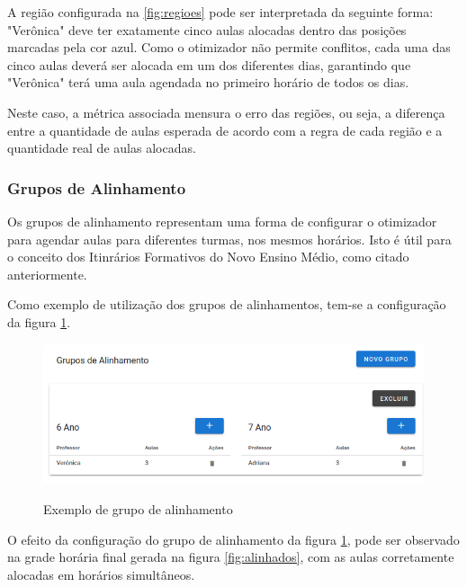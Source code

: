 A região configurada na \ref{fig:regioes} pode ser interpretada da seguinte forma: "Verônica" deve ter exatamente cinco aulas alocadas dentro das posições marcadas pela cor azul. Como o otimizador não permite conflitos, cada uma das cinco aulas deverá ser alocada em um dos diferentes dias, garantindo que "Verônica" terá uma aula agendada no primeiro horário de todos os dias.

Neste caso, a métrica associada mensura o erro das regiões, ou seja, a diferença entre a quantidade de aulas esperada de acordo com a regra de cada região e a quantidade real de aulas alocadas.

\subsubsection{Grupos de Alinhamento}

Os grupos de alinhamento representam uma forma de configurar o otimizador para agendar aulas para diferentes turmas, nos mesmos horários. Isto é útil para o conceito dos Itinrários Formativos do Novo Ensino Médio, como citado anteriormente.

Como exemplo de utilização dos grupos de alinhamentos, tem-se a configuração da figura \ref{fig:gruposAlinhamento}.

\begin{figure}[!htb]
	\centering
	\caption{Exemplo de grupo de alinhamento}
	\includegraphics[width=1\textwidth]{./dados/figuras/gruposAlinhamento}
	\label{fig:gruposAlinhamento}
\end{figure}
\pagebreak

O efeito da configuração do grupo de alinhamento da figura \ref{fig:gruposAlinhamento}, pode ser observado na grade horária final gerada na figura \ref{fig:alinhados}, com as aulas corretamente alocadas em horários simultâneos.

